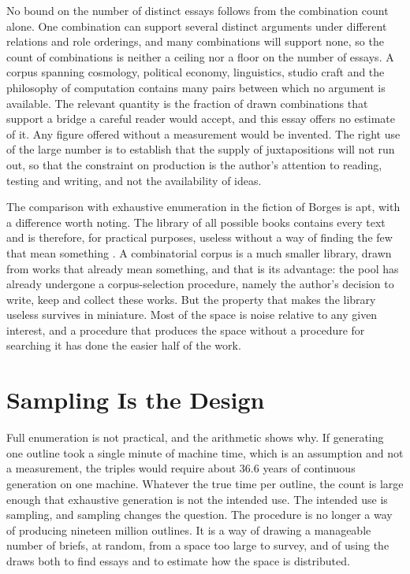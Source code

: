 \documentclass[11pt]{article}
\begin{document}
No bound on the number of distinct essays follows from the combination count alone. One combination can support several distinct arguments under different relations and role orderings, and many combinations will support none, so the count of combinations is neither a ceiling nor a floor on the number of essays. A corpus spanning cosmology, political economy, linguistics, studio craft and the philosophy of computation contains many pairs between which no argument is available. The relevant quantity is the fraction of drawn combinations that support a bridge a careful reader would accept, and this essay offers no estimate of it. Any figure offered without a measurement would be invented. The right use of the large number is to establish that the supply of juxtapositions will not run out, so that the constraint on production is the author's attention to reading, testing and writing, and not the availability of ideas.

The comparison with exhaustive enumeration in the fiction of Borges is apt, with a difference worth noting. The library of all possible books contains every text and is therefore, for practical purposes, useless without a way of finding the few that mean something \cite{borges1944}. A combinatorial corpus is a much smaller library, drawn from works that already mean something, and that is its advantage: the pool has already undergone a corpus-selection procedure, namely the author's decision to write, keep and collect these works. But the property that makes the library useless survives in miniature. Most of the space is noise relative to any given interest, and a procedure that produces the space without a procedure for searching it has done the easier half of the work.

\section{Sampling Is the Design}

Full enumeration is not practical, and the arithmetic shows why. If generating one outline took a single minute of machine time, which is an assumption and not a measurement, the triples would require about 36.6 years of continuous generation on one machine. Whatever the true time per outline, the count is large enough that exhaustive generation is not the intended use. The intended use is sampling, and sampling changes the question. The procedure is no longer a way of producing nineteen million outlines. It is a way of drawing a manageable number of briefs, at random, from a space too large to survey, and of using the draws both to find essays and to estimate how the space is distributed.
\end{document}
